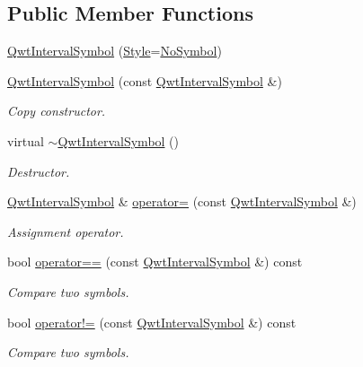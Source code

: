 \subsection*{Public Member Functions}
\begin{DoxyCompactItemize}
\item 
\hyperlink{class_qwt_interval_symbol_a40c03c5b54dc3c4a69cf1dc88bf25893}{Qwt\-Interval\-Symbol} (\hyperlink{class_qwt_interval_symbol_a8fe960fd50b3ad08765ef8bb632ad77e}{Style}=\hyperlink{class_qwt_interval_symbol_a8fe960fd50b3ad08765ef8bb632ad77ea48e0d047b9988e77067a11f784556019}{No\-Symbol})
\item 
\hyperlink{class_qwt_interval_symbol_a7a4ddf7e61445833f39105614ebd77c1}{Qwt\-Interval\-Symbol} (const \hyperlink{class_qwt_interval_symbol}{Qwt\-Interval\-Symbol} \&)
\begin{DoxyCompactList}\small\item\em Copy constructor. \end{DoxyCompactList}\item 
virtual \hyperlink{class_qwt_interval_symbol_ac983feda2d6417a24e430aa0cd0548b9}{$\sim$\-Qwt\-Interval\-Symbol} ()
\begin{DoxyCompactList}\small\item\em Destructor. \end{DoxyCompactList}\item 
\hyperlink{class_qwt_interval_symbol}{Qwt\-Interval\-Symbol} \& \hyperlink{class_qwt_interval_symbol_a49558f59372b7e69143f1ff49c5bfad8}{operator=} (const \hyperlink{class_qwt_interval_symbol}{Qwt\-Interval\-Symbol} \&)
\begin{DoxyCompactList}\small\item\em Assignment operator. \end{DoxyCompactList}\item 
bool \hyperlink{class_qwt_interval_symbol_a1fa66bf16cecbcc6a2a95d8484dbc0d3}{operator==} (const \hyperlink{class_qwt_interval_symbol}{Qwt\-Interval\-Symbol} \&) const 
\begin{DoxyCompactList}\small\item\em Compare two symbols. \end{DoxyCompactList}\item 
bool \hyperlink{class_qwt_interval_symbol_a89737a98021a7ebf3eddd79469257411}{operator!=} (const \hyperlink{class_qwt_interval_symbol}{Qwt\-Interval\-Symbol} \&) const 
\begin{DoxyCompactList}\small\item\em Compare two symbols. \end{DoxyCompactList}\item 

\end{DoxyCompactItemize}
